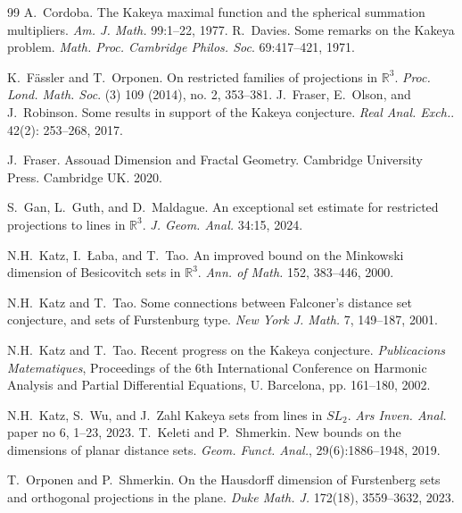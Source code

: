 \documentclass[letterpaper, reqno,11pt]{article}
\numberwithin{equation}{section}
\newcommand{\RR}{\mathbb{R}}
\numberwithin{thm}{section}
\theoremstyle{remark}
\begin{document}
\begin{thebibliography}{99}
 A.~Cordoba. The {K}akeya maximal function and the spherical summation multipliers. \emph{Am. J. Math.} 99:1--22, 1977.
%
 R.~Davies. Some remarks on the {K}akeya problem. \emph{Math. Proc. Cambridge Philos. Soc}.  69:417--421, 1971. 
%

 K.~F\"{a}ssler and T.~Orponen. On restricted families of projections in $\RR^3$. \emph{Proc. Lond. Math. Soc}. (3) 109 (2014), no. 2,
353–381.
%
%
 J.~Fraser, E.~Olson, and J.~Robinson. Some results in support of the Kakeya conjecture. \emph{Real Anal. Exch.}. 42(2): 253--268, 2017.
%


 J.~Fraser. Assouad Dimension and Fractal Geometry. Cambridge University Press. Cambridge UK. 2020.
%
%
%

 S.~Gan, L.~Guth, and D.~Maldague. An exceptional set estimate for restricted projections to lines in $\mathbb{R}^3$. \emph{J. Geom. Anal.} 34:15, 2024.
%

 N.H.~Katz, I.~\L{}aba, and T.~Tao. An improved bound on the Minkowski dimension of Besicovitch sets in $\RR^3$. \emph{Ann. of Math.} 152, 383--446, 2000.
%

 N.H.~Katz and T.~Tao. Some connections between Falconer's distance set conjecture, and sets of Furstenburg type. \emph{New York J. Math.} 7, 149--187, 2001.

 N.H.~Katz and T.~Tao. Recent progress on the Kakeya conjecture. \emph{Publicacions Matematiques}, Proceedings of the 6th International Conference on Harmonic Analysis and Partial Differential Equations, U. Barcelona, pp. 161--180, 2002.

 N.H.~Katz, S.~Wu, and J.~Zahl Kakeya sets from lines in $SL_2$. \emph{Ars Inven. Anal.} paper no 6, 1--23, 2023. 
%
 T.~Keleti and P.~Shmerkin. New bounds on the dimensions of planar distance sets. \emph{Geom. Funct. Anal.}, 29(6):1886--1948, 2019.

 T.~Orponen and P.~Shmerkin. On the Hausdorff dimension of Furstenberg sets and orthogonal projections in the plane. \emph{Duke Math. J.} 172(18), 3559--3632, 2023.


\end{thebibliography}
\end{document}
